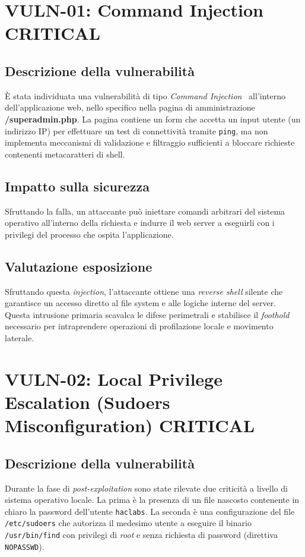 \documentclass[11pt]{report}
\newcommand{\sevCRIT}{\textcolor{sevCritico}{\textbf{CRITICAL}}}
\begin{document}
	\section[Command Injection]{VULN-01: Command Injection \hfill \sevCRIT}
	\subsection{Descrizione della vulnerabilità}
	È stata individuata una vulnerabilità di tipo \textit{Command Injection}~\cite{owasp-injection} all'interno dell'applicazione web, nello specifico nella pagina di amministrazione \textbf{/superadmin.php}. La pagina contiene un form che accetta un input utente (un indirizzo IP) per effettuare un test di connettività tramite \texttt{ping}, ma non implementa meccanismi di validazione e filtraggio sufficienti a bloccare richieste contenenti metacaratteri di shell.
	
	\subsection{Impatto sulla sicurezza}
	Sfruttando la falla, un attaccante può iniettare comandi arbitrari del sistema operativo all'interno della richiesta e indurre il web server a eseguirli con i privilegi del processo che ospita l'applicazione.
	
	\subsection{Valutazione esposizione}
	Sfruttando questa \textit{injection}, l'attaccante ottiene una \textit{reverse shell} silente che garantisce un accesso diretto al file system e alle logiche interne del server. Questa intrusione primaria scavalca le difese perimetrali e stabilisce il \textit{foothold} necessario per intraprendere operazioni di profilazione locale e movimento laterale.
	
	\section[Local Privilege Escalation]{VULN-02: Local Privilege Escalation (Sudoers Misconfiguration) \hfill \sevCRIT}
	\subsection{Descrizione della vulnerabilità}
	Durante la fase di \textit{post-exploitation} sono state rilevate due criticità a livello di sistema operativo locale. La prima è la presenza di un file nascosto contenente in chiaro la password dell'utente \texttt{haclabs}. La seconda è una configurazione del file \texttt{/etc/sudoers} che autorizza il medesimo utente a eseguire il binario \texttt{/usr/bin/find} con privilegi di \textit{root} e senza richiesta di password (direttiva \texttt{NOPASSWD}).
	
\end{document}
